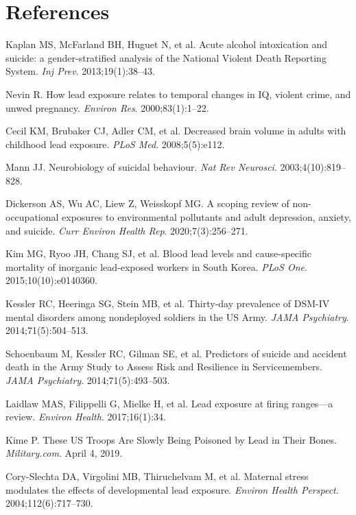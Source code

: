 \documentclass[11pt,twocolumn]{article}
\begin{document}
\section*{References}
{\small
\begin{enumerate}[label={[\arabic*]}, leftmargin=*, itemsep=1pt]
    \item Kaplan MS, McFarland BH, Huguet N, et al. Acute alcohol intoxication and suicide: a gender-stratified analysis of the National Violent Death Reporting System. \textit{Inj Prev}. 2013;19(1):38--43.
    \item Nevin R. How lead exposure relates to temporal changes in IQ, violent crime, and unwed pregnancy. \textit{Environ Res}. 2000;83(1):1--22.
    \item Cecil KM, Brubaker CJ, Adler CM, et al. Decreased brain volume in adults with childhood lead exposure. \textit{PLoS Med}. 2008;5(5):e112.
    \item Mann JJ. Neurobiology of suicidal behaviour. \textit{Nat Rev Neurosci}. 2003;4(10):819--828.
    \item Dickerson AS, Wu AC, Liew Z, Weisskopf MG. A scoping review of non-occupational exposures to environmental pollutants and adult depression, anxiety, and suicide. \textit{Curr Environ Health Rep}. 2020;7(3):256--271.
    \item Kim MG, Ryoo JH, Chang SJ, et al. Blood lead levels and cause-specific mortality of inorganic lead-exposed workers in South Korea. \textit{PLoS One}. 2015;10(10):e0140360.
    \item Kessler RC, Heeringa SG, Stein MB, et al. Thirty-day prevalence of DSM-IV mental disorders among nondeployed soldiers in the US Army. \textit{JAMA Psychiatry}. 2014;71(5):504--513.
    \item Schoenbaum M, Kessler RC, Gilman SE, et al. Predictors of suicide and accident death in the Army Study to Assess Risk and Resilience in Servicemembers. \textit{JAMA Psychiatry}. 2014;71(5):493--503.
    \item Laidlaw MAS, Filippelli G, Mielke H, et al. Lead exposure at firing ranges---a review. \textit{Environ Health}. 2017;16(1):34.
    \item Kime P. These US Troops Are Slowly Being Poisoned by Lead in Their Bones. \textit{Military.com}. April 4, 2019.
    \item Cory-Slechta DA, Virgolini MB, Thiruchelvam M, et al. Maternal stress modulates the effects of developmental lead exposure. \textit{Environ Health Perspect}. 2004;112(6):717--730.

\end{enumerate}}
\end{document}
